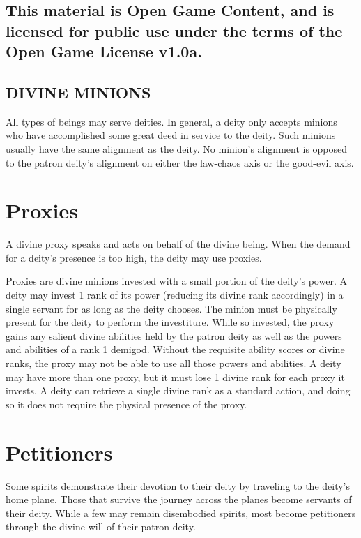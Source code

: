 \documentclass{article}
\begin{document}
\subsection*{This material is Open Game Content, and is licensed for public use 
under the terms of the Open Game License v1.0a.}

\subsection*{{\LARGE{}DIVINE MINIONS}}

\vspace{12pt}
All types of beings may serve deities. In general, a deity only accepts minions 
who have accomplished some great deed in service to the deity. Such minions usually 
have the same alignment as the deity. No minion's alignment is opposed to the patron 
deity's alignment on either the law-chaos axis or the good-evil axis. 

\vspace{12pt}
\section*{Proxies}

A divine proxy speaks and acts on behalf of the divine being. When the demand for 
a deity's presence is too high, the deity may use proxies.

Proxies are divine minions invested with a small portion of the deity's power. 
A deity may invest 1 rank of its power (reducing its divine rank accordingly) in 
a single servant for as long as the deity chooses. The minion must be physically 
present for the deity to perform the investiture. While so invested, the proxy 
gains any salient divine abilities held by the patron deity as well as the powers 
and abilities of a rank 1 demigod. Without the requisite ability scores or divine 
ranks, the proxy may not be able to use all those powers and abilities. A deity 
may have more than one proxy, but it must lose 1 divine rank for each proxy it 
invests. A deity can retrieve a single divine rank as a standard action, and doing 
so it does not require the physical presence of the proxy. 

\vspace{12pt}
\section*{Petitioners}

Some spirits demonstrate their devotion to their deity by traveling to the deity's 
home plane. Those that survive the journey across the planes become servants of 
their deity. While a few may remain disembodied spirits, most become petitioners 
through the divine will of their patron deity. 
\end{document}
